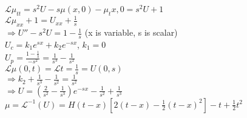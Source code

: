 \documentclass[10pt]{article}
\newcommand{\Lap}{\mathcal{L}}
\begin{document}
\begin{multicols}{2}
\begin{enumerate}
		$\Lap{\mu_{tt}} = s^2U-s\mu(x,0) - \mu_t{x,0} = s^2U + 1$\\
		$\Lap{\mu_{xx} + 1} = U_{xx} + \frac{1}{s}$\\
		$\Rightarrow U'' - s^2U = 1 - \frac{1}{s}$ (x is variable, s is scalar)\\
		$U_c = k_1e^{sx} + k_2e^{-sx}$, $k_1 = 0$\\
		$U_p = \frac{1 - \frac{1}{s}}{-s^2} = \frac{1}{s^3} - \frac{1}{s^2}$\\
		$\Lap{\mu(0,t)} = \Lap{t} = \frac{1}{s} = U(0,s)$\\
		$\Rightarrow k_2 + \frac{1}{s^3} - \frac{1}{s^2} = \frac{1}{s^2}$\\
		$\Rightarrow U = (\frac{2}{s^2} - \frac{1}{s^3})e^{-sx} - \frac{1}{s^2} + \frac{1}{s^3}$\\
		$\mu = \Lap^{-1}(U) = H(t-x)[2(t-x)-\frac{1}{2}(t-x)^2] - t + \frac{1}{2}t^2$ 
		
	\end{enumerate}
\end{multicols}
\end{document}
